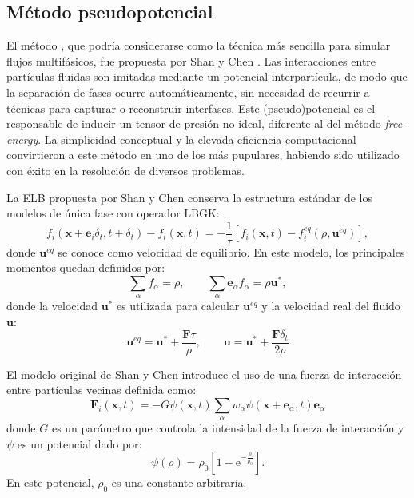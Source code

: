 \subsection*{M\'etodo pseudopotencial}
El m\'etodo \pp{}, que podr\'ia considerarse como la t\'ecnica m\'as sencilla para simular flujos multif\'asicos, fue propuesta por Shan y Chen \cite{shan_lattice_1993,shan_simulation_1994}. Las interacciones entre part\'iculas fluidas son imitadas mediante un potencial interpart\'icula, de modo que la separaci\'on de fases ocurre autom\'aticamente, sin necesidad de recurrir a t\'ecnicas para capturar o reconstruir interfases. Este (pseudo)potencial es el responsable de inducir un tensor de presi\'on no ideal, diferente al del m\'etodo \emph{free-energy}. La simplicidad conceptual y la elevada eficiencia computacional convirtieron a este m\'etodo en uno de los m\'as pupulares, habiendo sido utilizado con \'exito en la resoluci\'on de diversos problemas.
\par 
La ELB propuesta por Shan y Chen conserva la estructura est\'andar de los modelos de \'unica fase con operador LBGK:
\begin{equation}
	f_i(\bm{x}+\bm{e}_i\delta_t,t+\delta_t) - f_i(\bm{x},t)= -\dfrac{1}{\tau}\left[ f_i(\bm{x},t) - f_i^{eq}(\rho,\bm{u}^{eq}) \right],
\end{equation}
donde $\bm{u}^{eq}$ se conoce como velocidad de equilibrio. En este modelo, los principales momentos quedan definidos por:
\begin{equation}
	\sum_{\alpha} f_{\alpha} = \rho, \qquad	\sum_{\alpha} \bm{e}_{\alpha} f_{\alpha} = \rho \bm{u}^*,
\end{equation}
donde la velocidad $\bm{u}^*$ es utilizada para calcular $\bm{u}^{eq}$ y la velocidad real del fluido $\bm{u}$:
\begin{equation}
	\bm{u}^{eq} = \bm{u}^* + \dfrac{\bm{F}\tau}{\rho}, \qquad \bm{u} = \bm{u}^* + \dfrac{\bm{F}\delta_t}{2\rho}
\end{equation}

El modelo original de Shan y Chen introduce el uso de una fuerza de interacci\'on entre part\'iculas vecinas definida como:
\begin{equation}
	\bm{F}_{i}(\bm{x},t) = -G\psi(\bm{x},t)\sum_{\alpha} w_{\alpha} \psi(\bm{x}+\bm{e}_{\alpha},t)\bm{e}_{\alpha}
\end{equation}
donde $G$ es un par\'ametro que controla la intensidad de la fuerza de interacci\'on y $\psi$ es un potencial dado por:
\begin{equation}
	\psi(\rho) = \rho_0 \left[ 1-\mbox{e}^{-\frac{\rho}{\rho_0}} \right].
\end{equation}
En este potencial, $\rho_0$ es una constante arbitraria.

